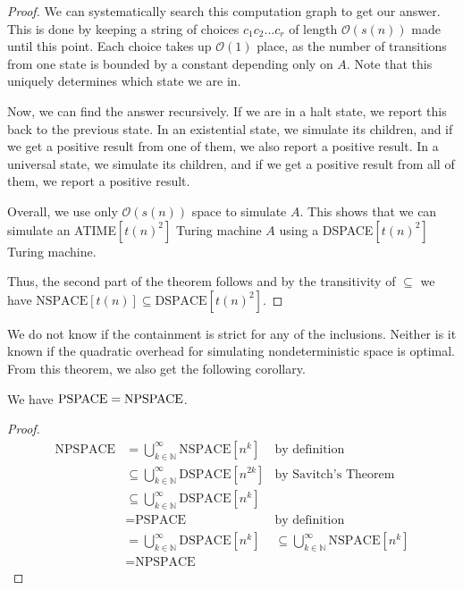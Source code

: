 \begin{proof}
    We can systematically search this computation graph to get our answer.
    This is done by keeping a string of choices $c_{1}c_{2}\dots c_r$ of length $\mathcal{O}(s(n))$ made until this point.
    Each choice takes up $\mathcal{O}(1)$ place, as the number of transitions from one state is bounded by a constant depending only on $A$.
    Note that this uniquely determines which state we are in.

    Now, we can find the answer recursively.
    If we are in a halt state, we report this back to the previous state.
    In an existential state, we simulate its children, and if we get a positive result from one of them, we also report a positive result.
    In a universal state, we simulate its children, and if we get a positive result from all of them, we report a positive result.

    Overall, we use only $\mathcal{O}(s(n))$ space to simulate $A$.
    This shows that we can simulate an ATIME$[t(n)^2]$ Turing machine $A$ using a DSPACE$[t(n)^2]$ Turing machine.

    Thus, the second part of the theorem follows and by the transitivity of $\subseteq$ we have $\text{NSPACE}[t(n)] \subseteq \text{DSPACE}[t(n)^2]$.
\end{proof}

We do not know if the containment is strict for any of the inclusions.
Neither is it known if the quadratic overhead for simulating nondeterministic space is optimal.
From this theorem, we also get the following corollary.

\begin{corollary}
    We have $\text{\upshape PSPACE} = \text{\upshape NPSPACE}$.
\end{corollary}

\begin{proof}
    \begin{align*}
        \text{NPSPACE} &= \bigcup_{k \in \mathbb{N}}^{\infty}\text{NSPACE}[n^k] & \text{by definition} \\
        &\subseteq \bigcup_{k\in \mathbb{N}}^{\infty}\text{DSPACE}[n^{2k}] & \text{by Savitch's Theorem} \\
        &\subseteq \bigcup_{k\in \mathbb{N}}^{\infty}\text{DSPACE}[n^{k}] \\
        &= \text{PSPACE} & \text{by definition} \\
        &= \bigcup_{k\in \mathbb{N}}^{\infty}\text{DSPACE}[n^{k}]
        &\subseteq \bigcup_{k\in \mathbb{N}}^{\infty}\text{NSPACE}[n^{k}] \\
        &= \text{NPSPACE}
    \end{align*}
\end{proof}


